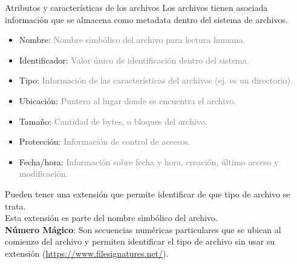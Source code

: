\documentclass[aspectratio=169]{beamer}
\begin{document}
\begin{frame}[fragile,t]{Atributos y características de los archivos}
    Los archivos tienen asociada información que se almacena como metadata dentro del sistema de archivos.
    { \small
    \begin{itemize}
    \setlength\itemsep{0px}
    \item Nombre: \textcolor{gray}{Nombre simbólico del archivo para lectura humana.}
    \item Identificador: \textcolor{gray}{Valor único de identificación dentro del sistema.}
    \item Tipo: \textcolor{gray}{Información de las características del archivos (ej. es un directorio).}
    \pause
    \item Ubicación: \textcolor{gray}{Puntero al lugar donde se encuentra el archivo.}
    \item Tamaño: \textcolor{gray}{Cantidad de bytes, o bloques del archivo.}
    \item Protección: \textcolor{gray}{Información de control de accesos.}
    \item Fecha/hora: \textcolor{gray}{Información sobre fecha y hora, creación, último acceso y modificación.}
    \end{itemize}
    }
    \pause
    Pueden tener una extensión que permite identificar de que tipo de archivo se trata.\\
    Esta extensión es parte del nombre simbólico del archivo.\\
    \pause
    \bigskip
    \textbf{Número Mágico}: Son secuencias numéricas particulares que se ubican al comienzo del archivo y permiten identificar el tipo de archivo sin usar su extensión {\scriptsize (\url{https://www.filesignatures.net/})}.
\end{frame}
\end{document}
